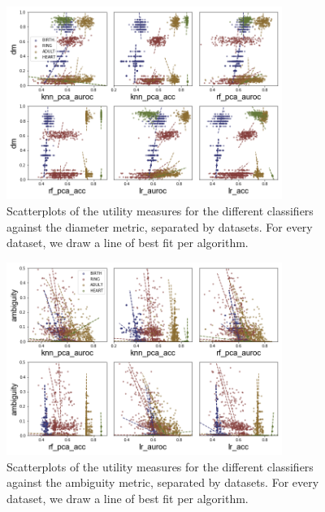 \begin{figure}[!ht]
    \centering
    \includegraphics[width=0.8\textwidth]{project/fig/scatter_sep_trends/dm_scatter.png}
    \caption{Scatterplots of the utility measures for the different classifiers against the diameter metric, separated by datasets. For every dataset, we draw a line of best fit per algorithm.}
\end{figure}

\begin{figure}[!ht]
    \centering
    \includegraphics[width=0.8\textwidth]{project/fig/scatter_sep_trends/ambiguity_scatter.png}
    \caption{Scatterplots of the utility measures for the different classifiers against the ambiguity metric, separated by datasets. For every dataset, we draw a line of best fit per algorithm.}
\end{figure}

